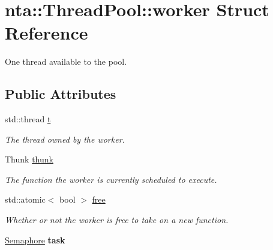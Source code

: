 \hypertarget{structnta_1_1ThreadPool_1_1worker}{}\section{nta\+:\+:Thread\+Pool\+:\+:worker Struct Reference}
\label{structnta_1_1ThreadPool_1_1worker}


One thread available to the pool.  


\subsection*{Public Attributes}
\begin{DoxyCompactItemize}
\item 
\mbox{\label{structnta_1_1ThreadPool_1_1worker_a83ae7aad18ecb7e4ec067124ff468c61}} 
std\+::thread \hyperlink{structnta_1_1ThreadPool_1_1worker_a83ae7aad18ecb7e4ec067124ff468c61}{t}
\begin{DoxyCompactList}\small\item\em The thread owned by the worker. \end{DoxyCompactList}\item 
\mbox{\label{structnta_1_1ThreadPool_1_1worker_ae89d0c70ce582b5ad934df4333134188}} 
Thunk \hyperlink{structnta_1_1ThreadPool_1_1worker_ae89d0c70ce582b5ad934df4333134188}{thunk}
\begin{DoxyCompactList}\small\item\em The function the worker is currently scheduled to execute. \end{DoxyCompactList}\item 
\mbox{\label{structnta_1_1ThreadPool_1_1worker_a0f5465cbf1df97563fbedb5847307a02}} 
std\+::atomic$<$ bool $>$ \hyperlink{structnta_1_1ThreadPool_1_1worker_a0f5465cbf1df97563fbedb5847307a02}{free}
\begin{DoxyCompactList}\small\item\em Whether or not the worker is free to take on a new function. \end{DoxyCompactList}\item 
\mbox{\label{structnta_1_1ThreadPool_1_1worker_a51b3306a20373a98256729fd6b9de52b}} 
\hyperlink{classnta_1_1Semaphore}{Semaphore} {\bfseries task}
\end{DoxyCompactItemize}


